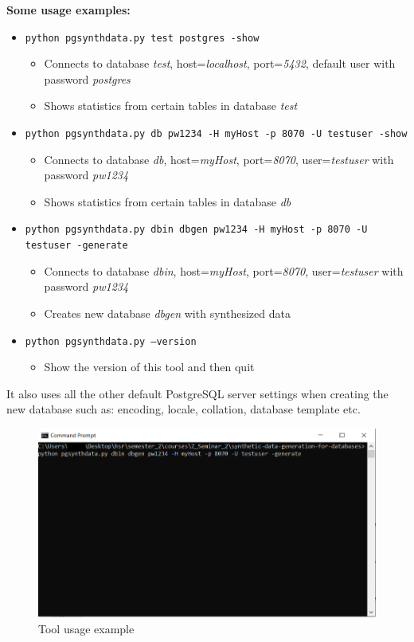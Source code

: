 \textbf{Some usage examples:}
\begin{itemize}
	\item \texttt{python pgsynthdata.py test postgres -show}
	\begin{itemize}
		\item Connects to database \textit{test}, host=\textit{localhost}, port=\textit{5432}, default user with password \textit{postgres}
		\item Shows statistics from certain tables in database \textit{test}
	\end{itemize}
	\item \texttt{python pgsynthdata.py db pw1234 -H myHost -p 8070 -U testuser -show}
	\begin{itemize}
		\item Connects to database \textit{db}, host=\textit{myHost}, port=\textit{8070}, user=\textit{testuser} with password \textit{pw1234}
		\item Shows statistics from certain tables in database \textit{db}
	\end{itemize}
	\item \texttt{python pgsynthdata.py dbin dbgen pw1234 -H myHost -p 8070 -U testuser -generate}
	\begin{itemize}
		\item Connects to database \textit{dbin}, host=\textit{myHost}, port=\textit{8070}, user=\textit{testuser} with password \textit{pw1234}
		\item Creates new database \textit{dbgen} with synthesized data
	\end{itemize}
	\item \texttt{python pgsynthdata.py --version}
	\begin{itemize}
		\item Show the version of this tool and then quit
	\end{itemize}
\end{itemize}
It also uses all the other default PostgreSQL server settings when creating the new database such as: encoding, locale, collation, database template etc.
\begin{figure}[H]
	\includegraphics[width=\linewidth]{./Figures/Implementation/tool_example_cmd.png}
	\caption{Tool usage example}
\end{figure}